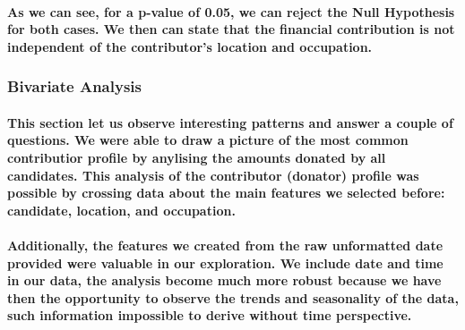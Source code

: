\documentclass[]{article}
\let\oldparagraph\paragraph
\renewcommand{\paragraph}[1]{\oldparagraph{#1}\mbox{}}
\begin{document}
\paragraph{As we can see, for a p-value of 0.05, we can reject the Null
Hypothesis for both cases. We then can state that the financial
contribution is not independent of the contributor's location and
occupation.}\label{as-we-can-see-for-a-p-value-of-0.05-we-can-reject-the-null-hypothesis-for-both-cases.-we-then-can-state-that-the-financial-contribution-is-not-independent-of-the-contributors-location-and-occupation.}

\subsubsection{Bivariate Analysis}\label{bivariate-analysis}

\paragraph{This section let us observe interesting patterns and answer a
couple of questions. We were able to draw a picture of the most common
contributior profile by anylising the amounts donated by all candidates.
This analysis of the contributor (donator) profile was possible by
crossing data about the main features we selected before: candidate,
location, and
occupation.}\label{this-section-let-us-observe-interesting-patterns-and-answer-a-couple-of-questions.-we-were-able-to-draw-a-picture-of-the-most-common-contributior-profile-by-anylising-the-amounts-donated-by-all-candidates.-this-analysis-of-the-contributor-donator-profile-was-possible-by-crossing-data-about-the-main-features-we-selected-before-candidate-location-and-occupation.}

\paragraph{Additionally, the features we created from the raw
unformatted date provided were valuable in our exploration. We include
date and time in our data, the analysis become much more robust because
we have then the opportunity to observe the trends and seasonality of
the data, such information impossible to derive without time
perspective.}\label{additionally-the-features-we-created-from-the-raw-unformatted-date-provided-were-valuable-in-our-exploration.-we-include-date-and-time-in-our-data-the-analysis-become-much-more-robust-because-we-have-then-the-opportunity-to-observe-the-trends-and-seasonality-of-the-data-such-information-impossible-to-derive-without-time-perspective.}
\end{document}
